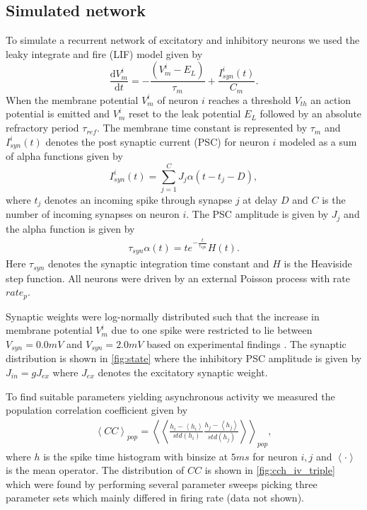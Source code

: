 \documentclass[11pt]{article}
\newcommand{\de}[2]{\frac{\mathrm{d} #1}{\mathrm{d} #2}}
\newcommand{\mean}[1]{\left<{#1}\right>}
\begin{document}
\subsection{Simulated network}
To simulate a recurrent network of excitatory and inhibitory neurons we used the leaky integrate and fire (LIF) model given by
\begin{equation}
	\de{V_m^i}{t} = - \frac{(V_m^i - E_L)}{\tau_m} + \frac{I_{syn}^i(t)}{C_m}.
    \label{eq:LIF}
\end{equation}
When the membrane potential $ V_m^{i} $ of neuron $ i $ reaches a threshold $ V_{th} $ an action potential is emitted and $ V_m^{i} $ reset to the leak potential $ E_{L} $ followed by an absolute refractory period $ \tau_{ref} $. 
The membrane time constant is represented by $ \tau_{m} $ and $ I_{syn}^{i}(t) $ denotes the post synaptic current (PSC) for neuron $ i $ modeled as a sum of alpha functions given by
\begin{equation}
	\label{eq:syn}
	I_{syn}^i(t) = \sum_{j=1}^C J_j \alpha(t - t_j - D),
\end{equation}
where $ t_j $ denotes an incoming spike through synapse $ j $ at delay $ D $ and $ C $ is the number of incoming synapses on neuron $ i $. 
The PSC amplitude is given by $ J_{j} $ and the alpha function is given by
\begin{align}
\tau_{syn}\alpha(t) = te^{-\frac{t}{\tau_{syn}}} H(t).
\end{align}
Here $ \tau_{syn} $ denotes the synaptic integration time constant and $ H $ is the Heaviside step function. 
All neurons were driven by an external Poisson process with rate $ rate_{p} $.

Synaptic weights were log-normally distributed such that the increase in membrane potential $ V_m^i $ due to one spike were restricted to lie between $ V_{syn} = 0.0 mV $ and $ V_{syn} = 2.0 mV $ based on experimental findings \citep{Sayer1990,Mason1991}. 
The synaptic distribution is shown in \cref{fig:state} where the inhibitory PSC amplitude is given by $ J_{in} = g J_{ex} $ where $ J_{ex} $ denotes the excitatory synaptic weight.

To find suitable parameters yielding asynchronous activity we measured the population correlation coefficient given by
\begin{align}
\mean{CC}_{pop} = \mean{\mean{\frac{h_{i} - \mean{h_{i}}}{std(h_{i})}\frac{h_{j} - \mean{h_{j}}}{std(h_{j})}}}_{pop},
\end{align}
where $ h $ is the spike time histogram with binsize at $ 5ms $ for neuron $ i,j $ and $ \mean{\cdot} $ is the mean operator. 
The distribution of $ CC $ is shown in \cref{fig:cch_iv_triple} which were found by performing several parameter sweeps picking three parameter sets which mainly differed in firing rate (data not shown). 
\end{document}
